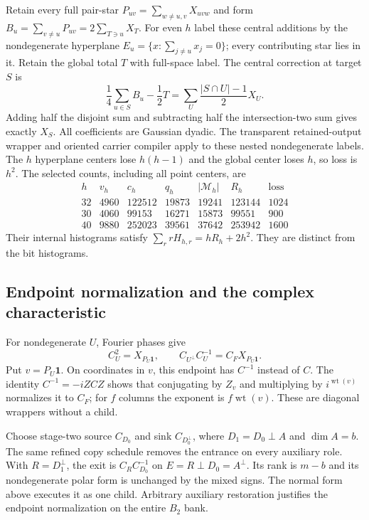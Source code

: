 Retain every full pair-star $P_{uv}=\sum_{w\ne u,v}X_{uvw}$ and form
$B_u=\sum_{v\ne u}P_{uv}=2\sum_{T\ni u}X_T$.
For even $h$ label these central additions by the nondegenerate
hyperplane $E_u=\{x:\sum_{j\ne u}x_j=0\}$; every contributing star
lies in it. Retain the global total $T$ with full-space label.
The central correction at target $S$ is
\[
 \frac14\sum_{u\in S}B_u-\frac12T
       =\sum_U\frac{|S\cap U|-1}{2}X_U.
\]
Adding half the disjoint sum and subtracting half the intersection-two
sum gives exactly $X_S$. All coefficients are Gaussian dyadic.
The transparent retained-output wrapper and oriented carrier compiler
apply to these nested nondegenerate labels. The $h$ hyperplane centers
lose $h(h-1)$ and the global center loses $h$, so loss is $h^2$.
The selected counts, including all point centers, are
\[
\begin{array}{c|rrrrrr}
h&v_h&c_h&q_h&|\mathcal M_h|&R_h&\text{loss}\\\hline
32&4960&122512&19873&19241&123144&1024\\
30&4060&99153&16271&15873&99551&900\\
40&9880&252023&39561&37642&253942&1600
\end{array}
\]
Their internal histograms satisfy $\sum_r rH_{h,r}=hR_h+2h^2$.
They are distinct from the bit histograms.

\subsection{Endpoint normalization and the complex characteristic}
For nondegenerate $U$, Fourier phases give
\[
 C_U^2=X_{P_U\mathbf1},\qquad
 C_{U^\perp}C_U^{-1}=C_FX_{P_U\mathbf1}.
\]
Put $v=P_U\mathbf1$. On coordinates in $v$, this endpoint has
$C^{-1}$ instead of $C$. The identity $C^{-1}=-iZCZ$ shows that
conjugating by $Z_v$ and multiplying by $i^{\operatorname{wt}(v)}$
normalizes it to $C_F$; for $f$ columns the exponent is
$f\operatorname{wt}(v)$. These are diagonal wrappers without a child.

Choose stage-two source $C_{D_0}$ and sink $C_{D_0^\perp}$, where
$D_1=D_0\mathbin{\perp} A$ and $\dim A=b$. The same refined copy
schedule removes the entrance on every auxiliary role. With
$R=D_1^\perp$, the exit is $C_RC_{D_0}^{-1}$ on
$E=R\mathbin{\perp}D_0=A^\perp$. Its rank is $m-b$ and its
nondegenerate polar form is unchanged by the mixed signs. The normal
form above executes it as one child. Arbitrary auxiliary restoration
justifies the endpoint normalization on the entire $B_2$ bank.

